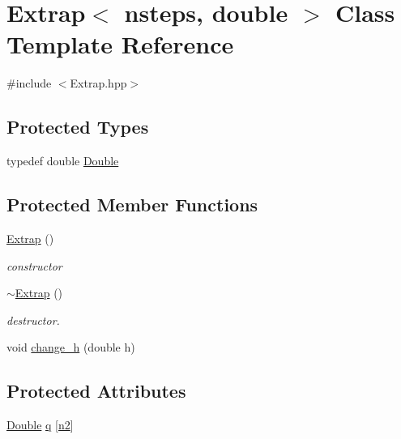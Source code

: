 \hypertarget{classExtrap_3_01nsteps_00_01double_01_4}{\section{Extrap$<$ nsteps, double $>$ Class Template Reference}
\label{classExtrap_3_01nsteps_00_01double_01_4}
}


{\ttfamily \#include $<$Extrap.\-hpp$>$}

\subsection*{Protected Types}
\begin{DoxyCompactItemize}
\item 
typedef double \hyperlink{classExtrap_3_01nsteps_00_01double_01_4_af13925ccfb64d4525fee7a11e6734208}{Double}
\end{DoxyCompactItemize}
\subsection*{Protected Member Functions}
\begin{DoxyCompactItemize}
\item 
\hyperlink{classExtrap_3_01nsteps_00_01double_01_4_a26930e0b38ecdbafaf44c6c85aecd97b}{Extrap} ()
\begin{DoxyCompactList}\small\item\em constructor \end{DoxyCompactList}\item 
\hyperlink{classExtrap_3_01nsteps_00_01double_01_4_aca25bdc32717e0bbcc4c26af208f59cb}{$\sim$\-Extrap} ()
\begin{DoxyCompactList}\small\item\em destructor. \end{DoxyCompactList}\item 
void \hyperlink{classExtrap_3_01nsteps_00_01double_01_4_a8ad3b8b2409b13fa5e75941579581371}{change\-\_\-h} (double h)
\end{DoxyCompactItemize}
\subsection*{Protected Attributes}
\begin{DoxyCompactItemize}
\item 
\hyperlink{classExtrap_3_01nsteps_00_01double_01_4_af13925ccfb64d4525fee7a11e6734208}{Double} \hyperlink{classExtrap_3_01nsteps_00_01double_01_4_ae1e59a8f88410fcabf179d1a488e311e}{q} \mbox{[}\hyperlink{classExtrap_3_01nsteps_00_01double_01_4_a4cd49fbd82ce46befba28f302ed390d0}{n2}\mbox{]}
\end{DoxyCompactItemize}
